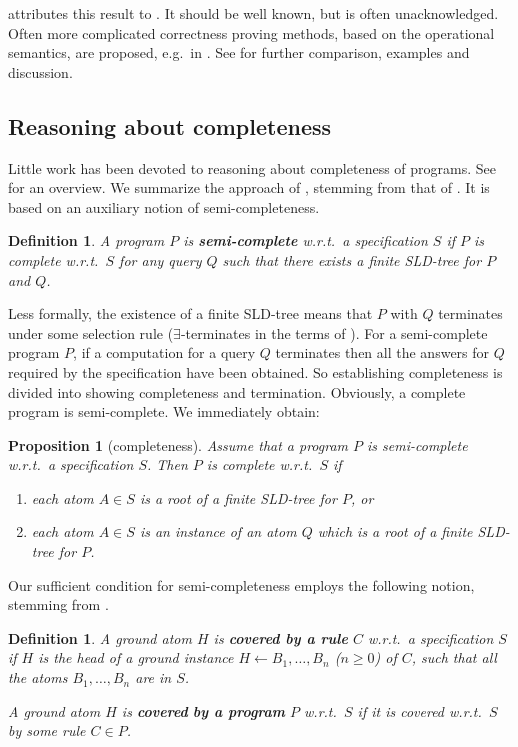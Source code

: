 \documentclass{tlp}
\newtheorem{proposition}[theorem]{Proposition}
\newtheorem{definition}[theorem]{Definition}
\newcommand*{\seq}[2][n]  {{#2_{1}, \allowbreak \ldots, \allowbreak #2_{#1}}}
\begin{document}
 attributes this result to \cite{Clark79}.
It  should be well known, but is often unacknowledged.
Often more complicated correctness proving methods, based on the operational
semantics, are proposed, e.g.\ in  \cite{Apt-Prolog}.
See \cite{DBLP:journals/tplp/DrabentM05shorter,drabent.tocl16}
for further comparison, examples and discussion.



\subsection{Reasoning about completeness}
\label{subsec:completeness}
Little work has been devoted to reasoning about completeness of programs.
See \cite{drabent.tocl16} for an overview.  We summarize the approach
of \cite{drabent.tocl16}, stemming from that of
\cite{DBLP:journals/tplp/DrabentM05shorter}.
It is based on an auxiliary notion of semi-completeness.


\pagebreak[3]
\begin{definition}
\nopagebreak
A program $P$ is {\bf semi-complete} 
w.r.t.\ a specification $S$ if
$P$ is complete w.r.t.\ $S$ for any query $Q$
such that there exists a finite SLD-tree for $P$ and $Q$.
\end{definition}


Less formally, the existence of a finite SLD-tree means
that $P$ with $Q$ terminates under some selection rule
($\exists$-terminates in the terms of \cite{PedreschiRS02.TPLP.terminating}).
For a semi-complete program $P$, if a computation for a query $Q$
terminates then all the answers for $Q$ required by the specification have
been obtained.
So establishing completeness is divided into showing completeness and
termination. 
Obviously, a complete program is semi-complete.
We immediately obtain:
\begin{proposition}[completeness]
\label{prop:completeness:trivial}
Assume that a program $P$ is semi-complete w.r.t.\ a specification $S$.
Then $P$ is complete w.r.t.\  $S$ if
  \begin{enumerate}
  \item each atom $A\in S$ is a root of a finite SLD-tree for $P$, or
  \item each atom $A\in S$ is an instance of an atom $Q$ which is a root of a
    finite SLD-tree for $P$.
  \end{enumerate}
\end{proposition}
\pagebreak[3]

Our sufficient condition for semi-completeness employs the
following notion, stemming from \cite{Shapiro.book}.
\begin{definition}
  A ground atom $H$ is
  {\bf covered by a rule} $C$ w.r.t.\ a specification $S$
if $H$ is the head of a ground instance  
  $
  H\gets \seq B
  $
  ($n\geq0$) of $C$, such that all the atoms $\seq B$ are in $S$.




  A ground atom $H$ is {\bf covered} {\bf by a program} $P$ w.r.t.\ $S$
  if it is covered w.r.t.\ $S$ by some rule $C\in P$.
\end{definition}
\end{document}
